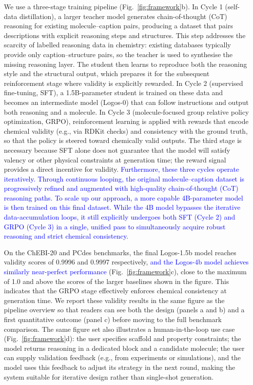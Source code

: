\documentclass[11pt]{article}
\begin{document}
We use a three-stage training pipeline (Fig.~\ref{fig:framework}b). In Cycle 1 (self-data distillation), a larger teacher model generates chain-of-thought (CoT) reasoning for existing molecule--caption pairs, producing a dataset that pairs descriptions with explicit reasoning steps and structures. This step addresses the scarcity of labelled reasoning data in chemistry: existing databases typically provide only caption--structure pairs, so the teacher is used to synthesise the missing reasoning layer. The student then learns to reproduce both the reasoning style and the structural output, which prepares it for the subsequent reinforcement stage where validity is explicitly rewarded. 
In Cycle 2 (supervised fine-tuning, SFT), a 1.5B-parameter student is trained on these data and becomes an intermediate model (Logos-0) that can follow instructions and output both reasoning and a molecule.
In Cycle 3 (molecule-focused group relative policy optimization, GRPO), reinforcement learning is applied with rewards that encode chemical validity (e.g., via RDKit checks) and consistency with the ground truth, so that the policy is steered toward chemically valid outputs. The third stage is necessary because SFT alone does not guarantee that the model will satisfy valency or other physical constraints at generation time; the reward signal provides a direct incentive for validity.
\textcolor{blue}{Furthermore, these three cycles operate iteratively. Through continuous looping, the original molecule--caption dataset is progressively refined and augmented with high-quality chain-of-thought (CoT) reasoning paths. To scale up our approach, a more capable 4B-parameter model is then trained on this final dataset. While the 4B model bypasses the iterative data-accumulation loops, it still explicitly undergoes both SFT (Cycle 2) and GRPO (Cycle 3) in a single, unified pass to simultaneously acquire robust reasoning and strict chemical consistency.}

On the ChEBI-20 and PCdes benchmarks\cite{edwards2021text2mol,edwards2022molt5}, the final Logos-1.5b model reaches validity scores of 0.9996 and 0.9997 respectively, \textcolor{blue}{and the Logos-4b model achieves similarly near-perfect performance} (Fig.~\ref{fig:framework}c), close to the maximum of 1.0 and above the scores of the larger baselines shown in the figure. This indicates that the GRPO stage effectively enforces chemical consistency at generation time. We report these validity results in the same figure as the pipeline overview so that readers can see both the design (panels a and b) and a first quantitative outcome (panel c) before moving to the full benchmark comparison. The same figure set also illustrates a human-in-the-loop use case (Fig.~\ref{fig:framework}d): the user specifies scaffold and property constraints; the model returns reasoning in a dedicated block and a candidate molecule; the user can supply validation feedback (e.g., from experiments or simulations), and the model uses this feedback to adjust its strategy in the next round, making the system suitable for iterative design rather than single-shot generation.
\end{document}
